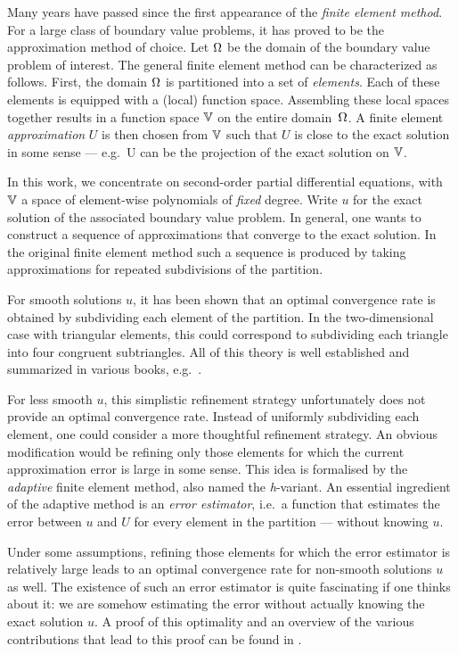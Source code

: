 \documentclass[thesis.tex]{subfiles}
\begin{document}
Many years have passed since the first appearance of the \emph{finite element method}. 
For a large class of boundary value problems, it has proved to be the approximation method of choice. 
Let $\Omega$ be the domain of the boundary value problem of interest. The general finite element method can be characterized as follows.
First, the domain $\Omega$ is partitioned into a set of \emph{elements}.  Each of these elements is equipped with a (local) function space.
Assembling these local spaces together results in a function space $\mathbb{V}$ on the entire domain~$\Omega$. A finite element \emph{approximation} $U$
is then chosen from $\mathbb{V}$ such that $U$ is close to the exact solution in some sense 
--- e.g.~U can be the projection of the exact solution on $\mathbb{V}$. 

In this work, we concentrate on second-order partial differential equations, with $\mathbb{V}$
a space of element-wise polynomials of \emph{fixed} degree. Write $u$ for the exact solution
of the associated boundary value problem. In general, one wants to construct a sequence of approximations that converge to
the exact solution. In the original finite element method such a sequence is produced by taking
approximations for repeated subdivisions of the partition. 

For smooth solutions $u$, it has been shown
that an optimal convergence rate is obtained by subdividing each element of the partition. 
In the two-dimensional case with triangular elements, this could correspond to subdividing each triangle into four
congruent subtriangles. All of this theory is well established and summarized  in various books, e.g.~\cite{brenner, zienkiewicz1977finite}.

For less smooth $u$, this simplistic refinement strategy unfortunately does not provide an optimal convergence rate.
Instead of uniformly subdividing each element, one could consider a more thoughtful refinement strategy.
An obvious modification would be refining only those elements for which the current approximation error is large in some sense.
This idea is formalised by the \emph{adaptive} finite element method, also named the \emph{h}-variant.
An essential ingredient of the adaptive method is an \emph{error estimator}, i.e.~a function that estimates
the error between $u$ and $U$ for every element in the partition --- without knowing $u$. 

Under some assumptions, refining those
elements for which the error estimator is relatively large leads to an optimal convergence rate for non-smooth
solutions $u$ as well. The existence of such an error estimator is quite fascinating  if one thinks about it: we
are somehow estimating the error without actually knowing the exact solution $u$. 
A proof of this optimality and an overview of the various contributions that lead to this proof can be found in \cite{cascon2008}.
\end{document}
